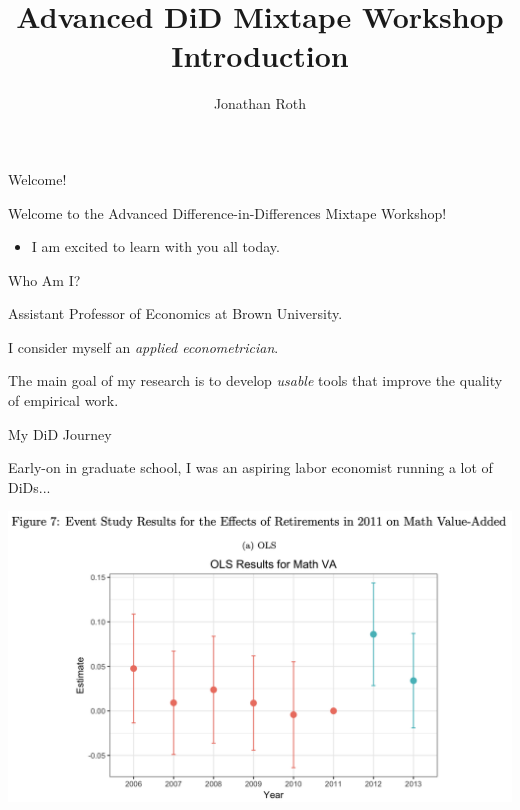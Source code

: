 \documentclass[aspectratio = 169, 12pt]{beamer}
\author{Jonathan Roth}
\title[Advanced DiD Mixtape Workshop]{Advanced DiD Mixtape Workshop \\ Introduction}
\begin{document}

\begin{frame}{Welcome!}
  \addtocounter{framenumber}{-1}

  Welcome to the Advanced Difference-in-Differences Mixtape Workshop!

  \medskip
  \begin{itemize}
    \item I am excited to learn with you all today.
  \end{itemize}

\end{frame}


\begin{frame}{Who Am I?}
  \begin{wideitemize}

    \item
    Assistant Professor of Economics at Brown University.

    \item
    I consider myself an \textit{applied econometrician}.

    \item
    The main goal of my research is to develop \textit{usable} tools that improve the quality of empirical work.

  \end{wideitemize}
\end{frame}


\begin{frame}{My DiD Journey}

  \begin{wideitemize}
    \item
    Early-on in graduate school, I was an aspiring labor economist running a lot of DiDs...

  \end{wideitemize}
  \centering
  \includegraphics[width =0.75\linewidth]{figures/act10-figure.png}

\end{frame}
\end{document}
